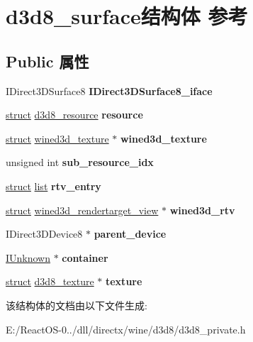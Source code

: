 \hypertarget{structd3d8__surface}{}\section{d3d8\+\_\+surface结构体 参考}
\label{structd3d8__surface}
\subsection*{Public 属性}
\begin{DoxyCompactItemize}
\item 
\mbox{\label{structd3d8__surface_a96962fbbef4dff78ee99d0c1654c9100}} 
I\+Direct3\+D\+Surface8 {\bfseries I\+Direct3\+D\+Surface8\+\_\+iface}
\item 
\mbox{\label{structd3d8__surface_aadc6abc9f7eeba7f82ad6e8accb977c2}} 
\hyperlink{interfacestruct}{struct} \hyperlink{structd3d8__resource}{d3d8\+\_\+resource} {\bfseries resource}
\item 
\mbox{\label{structd3d8__surface_ab9a5a1a9d703df9a812658884f416b18}} 
\hyperlink{interfacestruct}{struct} \hyperlink{structwined3d__texture}{wined3d\+\_\+texture} $\ast$ {\bfseries wined3d\+\_\+texture}
\item 
\mbox{\label{structd3d8__surface_a482d38cd903feb9be3be964178f7b9cc}} 
unsigned int {\bfseries sub\+\_\+resource\+\_\+idx}
\item 
\mbox{\label{structd3d8__surface_a54cb2a25c6b9d2ed740db9068914bcec}} 
\hyperlink{interfacestruct}{struct} \hyperlink{classlist}{list} {\bfseries rtv\+\_\+entry}
\item 
\mbox{\label{structd3d8__surface_a6a3363683df22e9f11eda0456244a125}} 
\hyperlink{interfacestruct}{struct} \hyperlink{structwined3d__rendertarget__view}{wined3d\+\_\+rendertarget\+\_\+view} $\ast$ {\bfseries wined3d\+\_\+rtv}
\item 
\mbox{\label{structd3d8__surface_a2a14c50abfb50379f74ef9453775f636}} 
I\+Direct3\+D\+Device8 $\ast$ {\bfseries parent\+\_\+device}
\item 
\mbox{\label{structd3d8__surface_ac073abbb855a71c98f8aad48c4e84875}} 
\hyperlink{interface_i_unknown}{I\+Unknown} $\ast$ {\bfseries container}
\item 
\mbox{\label{structd3d8__surface_a2d526dce6f654186cab3be282a266475}} 
\hyperlink{interfacestruct}{struct} \hyperlink{structd3d8__texture}{d3d8\+\_\+texture} $\ast$ {\bfseries texture}
\end{DoxyCompactItemize}


该结构体的文档由以下文件生成\+:\begin{DoxyCompactItemize}
\item 
E\+:/\+React\+O\+S-\/0../dll/directx/wine/d3d8/d3d8\+\_\+private.\+h\end{DoxyCompactItemize}
